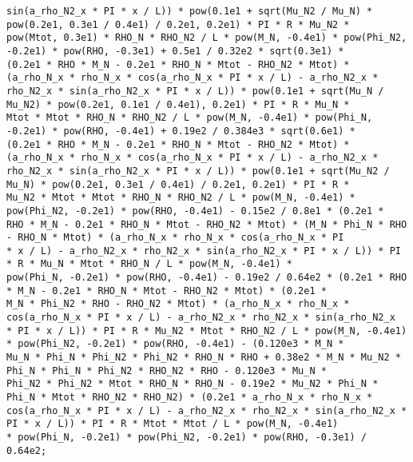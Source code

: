\documentclass[10pt]{article}
\begin{document}
\begin{scriptsize}
\begin{verbatim}
sin(a_rho_N2_x * PI * x / L)) * pow(0.1e1 + sqrt(Mu_N2 / Mu_N) * pow(0.2e1, 0.3e1 / 0.4e1) / 0.2e1, 0.2e1) * PI * R * Mu_N2 *
pow(Mtot, 0.3e1) * RHO_N * RHO_N2 / L * pow(M_N, -0.4e1) * pow(Phi_N2, -0.2e1) * pow(RHO, -0.3e1) + 0.5e1 / 0.32e2 * sqrt(0.3e1) *
(0.2e1 * RHO * M_N - 0.2e1 * RHO_N * Mtot - RHO_N2 * Mtot) * (a_rho_N_x * rho_N_x * cos(a_rho_N_x * PI * x / L) - a_rho_N2_x *
rho_N2_x * sin(a_rho_N2_x * PI * x / L)) * pow(0.1e1 + sqrt(Mu_N / Mu_N2) * pow(0.2e1, 0.1e1 / 0.4e1), 0.2e1) * PI * R * Mu_N *
Mtot * Mtot * RHO_N * RHO_N2 / L * pow(M_N, -0.4e1) * pow(Phi_N, -0.2e1) * pow(RHO, -0.4e1) + 0.19e2 / 0.384e3 * sqrt(0.6e1) *
(0.2e1 * RHO * M_N - 0.2e1 * RHO_N * Mtot - RHO_N2 * Mtot) * (a_rho_N_x * rho_N_x * cos(a_rho_N_x * PI * x / L) - a_rho_N2_x *
rho_N2_x * sin(a_rho_N2_x * PI * x / L)) * pow(0.1e1 + sqrt(Mu_N2 / Mu_N) * pow(0.2e1, 0.3e1 / 0.4e1) / 0.2e1, 0.2e1) * PI * R *
Mu_N2 * Mtot * Mtot * RHO_N * RHO_N2 / L * pow(M_N, -0.4e1) * pow(Phi_N2, -0.2e1) * pow(RHO, -0.4e1) - 0.15e2 / 0.8e1 * (0.2e1 *
RHO * M_N - 0.2e1 * RHO_N * Mtot - RHO_N2 * Mtot) * (M_N * Phi_N * RHO - RHO_N * Mtot) * (a_rho_N_x * rho_N_x * cos(a_rho_N_x * PI
* x / L) - a_rho_N2_x * rho_N2_x * sin(a_rho_N2_x * PI * x / L)) * PI * R * Mu_N * Mtot * RHO_N / L * pow(M_N, -0.4e1) *
pow(Phi_N, -0.2e1) * pow(RHO, -0.4e1) - 0.19e2 / 0.64e2 * (0.2e1 * RHO * M_N - 0.2e1 * RHO_N * Mtot - RHO_N2 * Mtot) * (0.2e1 *
M_N * Phi_N2 * RHO - RHO_N2 * Mtot) * (a_rho_N_x * rho_N_x * cos(a_rho_N_x * PI * x / L) - a_rho_N2_x * rho_N2_x * sin(a_rho_N2_x
* PI * x / L)) * PI * R * Mu_N2 * Mtot * RHO_N2 / L * pow(M_N, -0.4e1) * pow(Phi_N2, -0.2e1) * pow(RHO, -0.4e1) - (0.120e3 * M_N *
Mu_N * Phi_N * Phi_N2 * Phi_N2 * RHO_N * RHO + 0.38e2 * M_N * Mu_N2 * Phi_N * Phi_N * Phi_N2 * RHO_N2 * RHO - 0.120e3 * Mu_N *
Phi_N2 * Phi_N2 * Mtot * RHO_N * RHO_N - 0.19e2 * Mu_N2 * Phi_N * Phi_N * Mtot * RHO_N2 * RHO_N2) * (0.2e1 * a_rho_N_x * rho_N_x *
cos(a_rho_N_x * PI * x / L) - a_rho_N2_x * rho_N2_x * sin(a_rho_N2_x * PI * x / L)) * PI * R * Mtot * Mtot / L * pow(M_N, -0.4e1)
* pow(Phi_N, -0.2e1) * pow(Phi_N2, -0.2e1) * pow(RHO, -0.3e1) / 0.64e2;


\end{verbatim}
\end{scriptsize}
\end{document}
